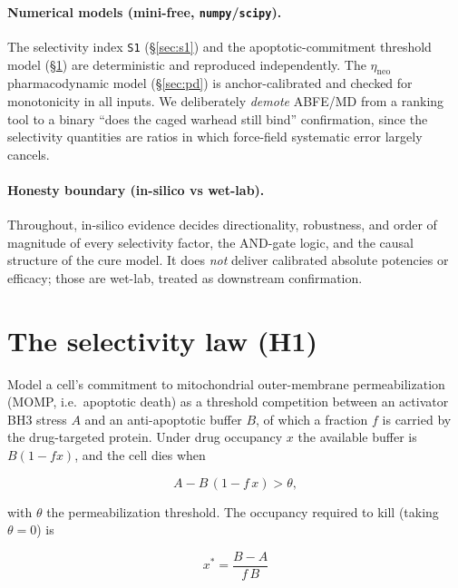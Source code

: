 \documentclass[11pt,a4paper]{article}
\begin{document}
\paragraph{Numerical models (mini-free, \texttt{numpy}/\texttt{scipy}).}
The selectivity index \texttt{S1} (\S\ref{sec:s1}) and the apoptotic-commitment
threshold model (\S\ref{sec:law}) are deterministic and reproduced
independently. The $\eta_{\mathrm{neo}}$ pharmacodynamic model
(\S\ref{sec:pd}) is anchor-calibrated and checked for monotonicity in all
inputs. We deliberately \emph{demote} ABFE/MD from a ranking tool to a binary
``does the caged warhead still bind'' confirmation, since the selectivity
quantities are ratios in which force-field systematic error largely cancels.

\paragraph{Honesty boundary (in-silico vs wet-lab).}
Throughout, in-silico evidence decides directionality, robustness, and order of
magnitude of every selectivity factor, the AND-gate logic, and the causal
structure of the cure model. It does \emph{not} deliver calibrated absolute
potencies or efficacy; those are wet-lab, treated as downstream confirmation.

\section{The selectivity law (H1)}
\label{sec:law}

Model a cell's commitment to mitochondrial outer-membrane permeabilization
(MOMP, i.e.\ apoptotic death) as a threshold competition between an activator
BH3 stress $A$ and an anti-apoptotic buffer $B$, of which a fraction $f$ is
carried by the drug-targeted protein. Under drug occupancy $x$ the available
buffer is $B(1-fx)$, and the cell dies when

\begin{equation}
A - B\,(1 - f\,x) > \theta ,
\label{eq:momp}
\end{equation}

with $\theta$ the permeabilization threshold. The occupancy required to kill
(taking $\theta=0$) is

\begin{equation}
\boxed{\;x^{*} = \dfrac{B - A}{f\,B}\;}
\label{eq:xstar}
\end{equation}
\end{document}
